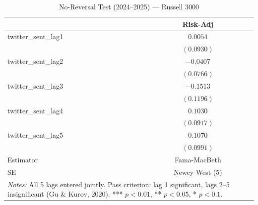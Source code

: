 \begin{table}[htbp]
\centering
\caption{No-Reversal Test (2024--2025) --- Russell 3000}
\label{tab:russel_2024_t3}
\begin{tabular}{lc}
\hline\hline
 & Risk-Adj \\
\hline
twitter\_sent\_lag1 & $0.0054$ \\
               & $(0.0930)$ \\
twitter\_sent\_lag2 & $-0.0407$ \\
               & $(0.0766)$ \\
twitter\_sent\_lag3 & $-0.1513$ \\
               & $(0.1196)$ \\
twitter\_sent\_lag4 & $0.1030$ \\
               & $(0.0917)$ \\
twitter\_sent\_lag5 & $0.1070$ \\
               & $(0.0991)$ \\
\hline
Estimator & Fama-MacBeth \\
SE & Newey-West (5) \\
\hline\hline
\multicolumn{2}{p{0.85\linewidth}}{\footnotesize \textit{Notes:} All 5 lags entered jointly. Pass criterion: lag 1 significant, lags 2--5 insignificant (Gu \& Kurov, 2020). *** $p<0.01$, ** $p<0.05$, * $p<0.1$.}\n\end{tabular}
\end{table}